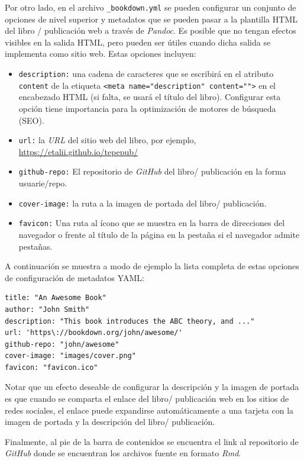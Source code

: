 \documentclass[
]{book}
\begin{document}
Por otro lado, en el archivo \texttt{\_bookdown.yml} se pueden configurar un conjunto de opciones de nivel superior y metadatos que se pueden pasar a la plantilla HTML del libro / publicación web a través de \emph{Pandoc}. Es posible que no tengan efectos visibles en la salida HTML, pero pueden ser útiles cuando dicha salida se implementa como sitio web. Estas opciones incluyen:

\begin{itemize}
\item
  \texttt{description:} una cadena de caracteres que se escribirá en el atributo \texttt{content} de la etiqueta \texttt{\textless{}meta\ name="description"\ content=""\textgreater{}} en el encabezado HTML (si falta, se usará el título del libro). Configurar esta opción tiene importancia para la optimización de motores de búsqueda (SEO).
\item
  \texttt{url:} la \emph{URL} del sitio web del libro, por ejemplo, \url{https://etalii.github.io/tepepub/}
\item
  \texttt{github-repo:} El repositorio de \emph{GitHub} del libro/ publicación en la forma usuarie/repo.
\item
  \texttt{cover-image:} la ruta a la imagen de portada del libro/ publicación.
\item
  \texttt{favicon:} Una ruta al ícono que se muestra en la barra de direcciones del navegador o frente al título de la página en la pestaña si el navegador admite pestañas.
\end{itemize}

A continuación se muestra a modo de ejemplo la lista completa de estas opciones de configuración de metadatos YAML:

\begin{verbatim}
title: "An Awesome Book"
author: "John Smith"
description: "This book introduces the ABC theory, and ..."
url: 'https\://bookdown.org/john/awesome/'
github-repo: "john/awesome"
cover-image: "images/cover.png"
favicon: "favicon.ico"
\end{verbatim}

Notar que un efecto deseable de configurar la descripción y la imagen de portada es que cuando se comparta el enlace del libro/ publicación web en los sitios de redes sociales, el enlace puede expandirse automáticamente a una tarjeta con la imagen de portada y la descripción del libro/ publicación.

Finalmente, al pie de la barra de contenidos se encuentra el link al repositorio de \emph{GitHub} donde se encuentran los archivos fuente en formato \emph{Rmd}.
\end{document}
